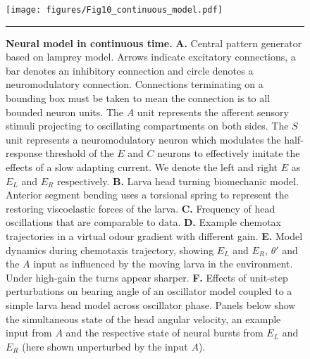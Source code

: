 \documentclass[11pt,a4paper]{article}
\newcommand{\todoBW}[1]{\todo[author=BW,color=orange, size=\tiny,inline]{1}}
\begin{document}
\begin{figure}
\begin{center}
\texttt{[image: figures/Fig10\_continuous\_model.pdf]}
\caption{{\bf Neural model in continuous time.} {\bf A.} Central pattern generator based on lamprey model. Arrows indicate excitatory connections, a bar denotes an inhibitory connection and circle denotes a neuromodulatory connection. Connections terminating on a bounding box must be taken to mean the connection is to all bounded neuron units. The $A$ unit represents the afferent sensory stimuli projecting to oscillating compartments on both sides. The $S$ unit represents a neuromodulatory neuron which  modulates the half-response threshold of the $E$ and $C$ neurons \cite[see]{wilson1999spikes} to effectively imitate the effects of a slow adapting current. We denote the left and right $E$ as $E_L$ and $E_R$ respectively.
{\bf B.} Larva head turning biomechanic model. Anterior segment bending uses a torsional spring to represent the restoring viscoelastic forces of the larva.
{\bf C.} Frequency of head oscillations that are comparable to data.
{\bf D.} Example chemotax trajectories in a virtual odour gradient with different gain.
{\bf E.} Model dynamics during chemotaxis trajectory, showing $E_L$ and  $E_R$, $\theta'$ and the $A$ input as influenced by the moving larva in the environment. Under high-gain the turns appear sharper.
{\bf F.} Effects of unit-step perturbations on bearing angle of an oscillator model coupled to a simple larva head model across oscillator phase. Panels below show the simultaneous state of the head angular velocity, an example input from $A$ and the respective state of neural bursts from $E_L$ and $E_R$ (here shown unperturbed by the input $A$).
\label{fig:LampreyModel}}
\hrule
\end{center}
\end{figure}
\end{document}
